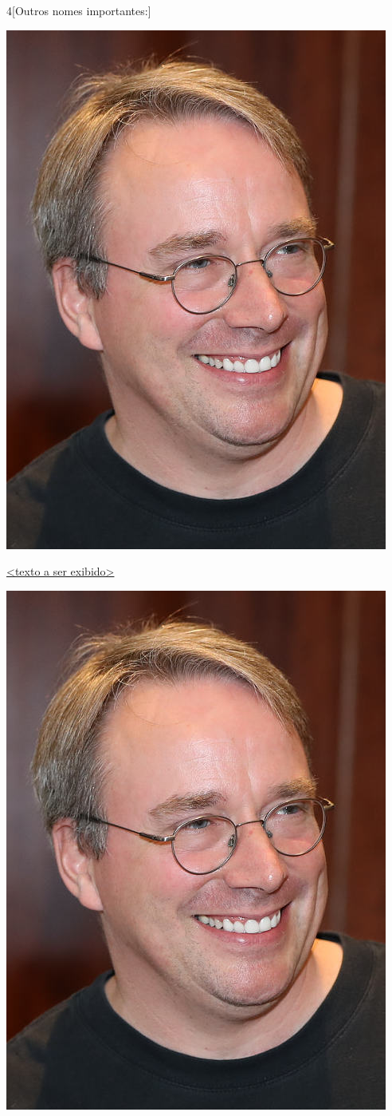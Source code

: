 \begin{multicols}{4}[Outros nomes importantes:]
\begin{center}
					\includegraphics[width=.8\columnwidth]{./IMG-GIT/CIENTISTAS/linus.jpeg}
\end{center}
				
\vfill\null

\columnbreak				
				
				\href{https://pt.wikipedia.org/wiki/Jim_Gray}{<texto a ser exibido>}
				
\begin{center}
					\includegraphics[width=.8\columnwidth]{./IMG-GIT/CIENTISTAS/linus.jpeg}
\end{center}
				

\end{multicols}
